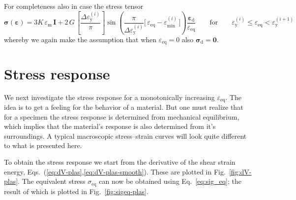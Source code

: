 \documentclass[times,namecite]{goose-article}
\begin{document}
For completeness also in case the stress tensor
\begin{equation}
  \bm{\sigma} ( \bm{\varepsilon} )
  =
  3 K \, \varepsilon_\mathrm{m} \, \bm{I}
  +
  2 \, G \,
  \left[ \frac{\Delta \varepsilon_\mathrm{y}^{(i)}}{\pi} \right]
  \sin \left(
    \frac{ \pi }{ \Delta \varepsilon_\mathrm{y}^{(i)} }
    \Big[\, \varepsilon_\mathrm{eq} - \varepsilon_\mathrm{min}^{(i)} \,\Big]
  \right)
  \frac{\bm{\varepsilon}_\mathrm{d}}{\varepsilon_\mathrm{eq}}
  \qquad
  \mathrm{for}
  \qquad
  \varepsilon_\mathrm{y}^{(i)} \leq \varepsilon_\mathrm{eq} < \varepsilon_\mathrm{y}^{(i+1)}
\end{equation}
whereby we again make the assumption that when $\varepsilon_\mathrm{eq} = 0$ also $\bm{\sigma}_\mathrm{d} = \bm{0}$.

\section{Stress response}

We next investigate the stress response for a monotonically increasing $\varepsilon_\mathrm{eq}$. The idea is to get a feeling for the behavior of a material. But one must realize that for a specimen the stress response is determined from mechanical equilibrium, which implies that the material's response is also determined from it's surroundings. A typical macroscopic stress--strain curves will look quite different to what is presented here.

To obtain the stress response we start from the derivative of the shear strain energy, Eqs.~(\ref{eq:dV-plas},\ref{eq:dV-plas-smooth}). These are plotted in Fig.~\ref{fig:dV-plas}. The equivalent stress $\sigma_\mathrm{eq}$ can now be obtained using Eq.~\eqref{eq:sig_eq}; the result of which is plotted in Fig.~\ref{fig:sigeq-plas}.
\end{document}
